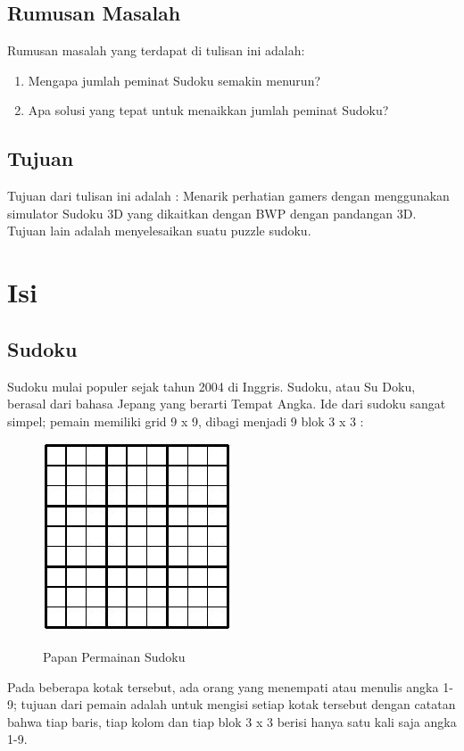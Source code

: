 \documentclass[11pt,a4paper]{report}
\begin{document}
\section{Rumusan Masalah}
Rumusan masalah yang terdapat di tulisan ini adalah:
\begin{enumerate}
	\item Mengapa jumlah peminat Sudoku semakin menurun?
	\item Apa solusi yang tepat untuk menaikkan jumlah peminat Sudoku?
\end{enumerate}

\section{Tujuan}
Tujuan dari tulisan ini adalah : Menarik perhatian gamers dengan menggunakan simulator Sudoku 3D yang dikaitkan dengan BWP dengan pandangan 3D. Tujuan lain adalah menyelesaikan suatu puzzle sudoku.

\chapter{Isi} %
\section{Sudoku}
\indent Sudoku mulai populer sejak tahun 2004 di Inggris. Sudoku, atau Su Doku, berasal dari bahasa Jepang yang berarti Tempat Angka. Ide dari sudoku sangat simpel; pemain memiliki grid 9 x 9, dibagi menjadi 9 blok 3 x 3 :
\begin{figure}[h]
\centering
\includegraphics{sudoku}\\ \vspace{1cm}
\caption[Papan Permainan Sudoku]{Papan Permainan Sudoku} 
\end{figure}

\indent Pada beberapa kotak tersebut, ada orang yang menempati atau menulis angka 1-9; tujuan dari pemain adalah untuk mengisi setiap kotak tersebut dengan catatan bahwa tiap baris, tiap kolom dan tiap blok 3 x 3 berisi hanya satu kali saja angka 1-9.
\end{document}
